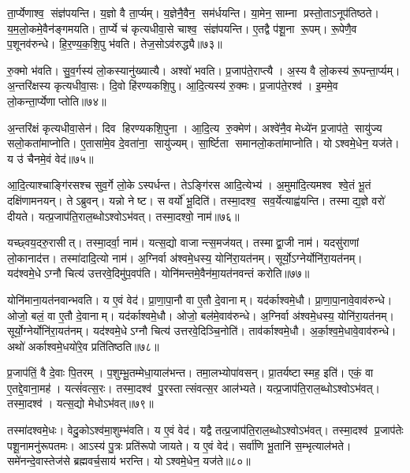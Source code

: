 ता॒र्प्येणाश्व॒ संज्ञ॑पयन्ति।
य॒ज्ञो वै ता॒र्प्यम्।
य॒ज्ञेनै॒वैन॒ सम॑र्धयन्ति।
या॒मेन॒ साम्ना प्रस्तो॒ताऽनूप॑तिष्ठते।
य॒म॒लो॒कमे॒वैन॑ङ्गमयति।
ता॒र्प्ये च॑ कृत्यधीवा॒से चाश्व॒ संज्ञ॑पयन्ति।
ए॒तद्वै प॑शू॒ना रू॒पम्।
रू॒पेणै॒व प॒शूनव॑रुन्धे।
हि॒र॒ण्य॒क॒शि॒पु भ॑वति।
तेज॒सोऽव॑रुद्ध्यै॥७३॥

रु॒क्मो भ॑वति।
सु॒व॒र्गस्य॑ लो॒कस्यानु॑ख्यात्यै।
अश्वो॑ भवति।
प्र॒जाप॑ते॒राप्त्यै।
अ॒स्य वै लो॒कस्य॑ रू॒पन्ता॒र्प्यम्।
अ॒न्तरि॑क्षस्य कृत्यधीवा॒सः।
दि॒वो हि॑रण्यकशि॒पु।
आ॒दि॒त्यस्य॑ रु॒क्मः।
प्र॒जाप॑ते॒रश्व॑।
इ॒ममे॒व लो॒कन्ता॒र्प्येणाप्तोति॥७४॥

अ॒न्तरि॑क्षं कृत्यधीवा॒सेन॑।
दिव हिरण्यकशि॒पुना।
आ॒दि॒त्य रु॒क्मेण॑।
अश्वे॑नै॒व मेध्ये॑न प्र॒जाप॑ते॒ सायु॑ज्य सलो॒कता॑माप्नोति।
ए॒तासा॑मे॒व दे॒वता॑ना॒ सायु॑ज्यम्।
सा॒र्ष्टिता समानलो॒कता॑माप्नोति।
योऽश्वमे॒धेन॒ यज॑ते।
य उ॑ चैनमे॒वं वेद॑॥७५॥\anuvakamend[अव॑रुध्या आप्नोत्य॒ष्टौ च॑]

आ॒दि॒त्याश्चाङ्गि॑रसश्च सुव॒र्गे लो॒केऽस्पर्धन्त।
तेऽङ्गि॑रस आदि॒त्येभ्य॑।
अ॒मुमा॑दि॒त्यमश्व श्वे॒तं भू॒तं दक्षि॑णामनयन्।
तेऽब्रुवन्।
यन्नो नेष्ट।
स वर्यो॑ भू॒दिति॑।
तस्मा॒दश्व॒ सव॒र्येत्याह्व॑यन्ति।
तस्माद्य॒ज्ञे वरो॑ दीयते।
यत्प्र॒जाप॑ति॒राल॒ब्धोऽश्वोऽभ॑वत्।
तस्मा॒दश्वो॒ नाम॑॥७६॥

यच्छ्वय॒दरु॒रासीत्।
तस्मा॒दर्वा॒ नाम॑।
यत्स॒द्यो वाजान्त्स॒मज॑यत्।
तस्माद्वा॒जी नाम॑।
यदसु॑राणां लो॒कानाद॑त्त।
तस्मा॑दादि॒त्यो नाम॑।
अ॒ग्निर्वा अ॑श्वमे॒धस्य॒ योनि॑रा॒यत॑नम्।
सूर्यो॒ऽग्नेर्योनि॑रा॒यत॑नम्।
यद॑श्वमे॒धेऽग्नौ चित्य॑ उत्तरवे॒दिमु॑प॒वप॑ति।
योनि॑मन्तमे॒वैन॑मा॒यत॑नवन्तं करोति॥७७॥

योनि॑माना॒यत॑नवान्भवति।
य ए॒वं वेद॑।
प्रा॒णा॒पा॒नौ वा ए॒तौ दे॒वानाम्।
यद॑र्काश्वमे॒धौ।
प्रा॒णा॒पा॒नावे॒वाव॑रुन्धे।
ओजो॒ बलं॒ वा ए॒तौ दे॒वानाम्।
यद॑र्काश्वमे॒धौ।
ओजो॒ बल॑मे॒वाव॑रुन्धे।
अ॒ग्निर्वा अ॑श्वमे॒धस्य॒ योनि॑रा॒यत॑नम्।
सूर्यो॒ग्नेर्योनि॑रा॒यत॑नम्।
यद॑श्वमे॒धेऽग्नौ चित्य॑ उत्तरवे॒दिञ्चि॒नोति॑।
ताव॑र्काश्वमे॒धौ।
अ॒र्का॒श्व॒मे॒धावे॒वाव॑रुन्धे।
अथो॑ अर्काश्वमे॒धयो॑रे॒व प्रति॑तिष्ठति॥७८॥\anuvakamend[नाम॑ करोति॒ सूर्यो॒ऽग्नेर्योनि॑रा॒यत॑नञ्च॒त्वारि॑ च]

प्र॒जाप॑तिं॒ वै दे॒वाः पि॒तरम्।
प॒शुम्भू॒तम्मेधा॒याल॑भन्त।
तमा॒लभ्योपा॑वसन्।
प्रा॒तर्यष्टास्मह॒ इति॑।
एकं॒ वा ए॒तद्दे॒वाना॒मह॑।
यत्सं॑वत्स॒रः।
तस्मा॒दश्व॑ पु॒रस्तात्संवत्स॒र आल॑भ्यते।
यत्प्र॒जाप॑ति॒राल॒ब्धोऽश्वोऽभ॑वत्।
तस्मा॒दश्व॑।
यत्स॒द्यो मेधोऽभ॑वत्॥७९॥

तस्मा॑दश्वमे॒धः।
वेदु॒कोऽश्व॑मा॒शुम्भ॑वति।
य ए॒वं वेद॑।
यद्वै तत्प्र॒जाप॑ति॒राल॒ब्धोऽश्वोऽभ॑वत्।
तस्मा॒दश्व॑ प्र॒जाप॑तेः पशू॒नामनु॑रूपतमः।
आऽस्य॑ पु॒त्रः प्रति॑रूपो जायते।
य ए॒वं वेद॑।
सर्वा॑णि भू॒तानि॑ स॒म्भृत्याल॑भते।
समे॑नन्दे॒वास्तेज॑से ब्रह्मवर्च॒साय॑ भरन्ति।
योऽश्वमे॒धेन॒ यज॑ते॥८०॥

